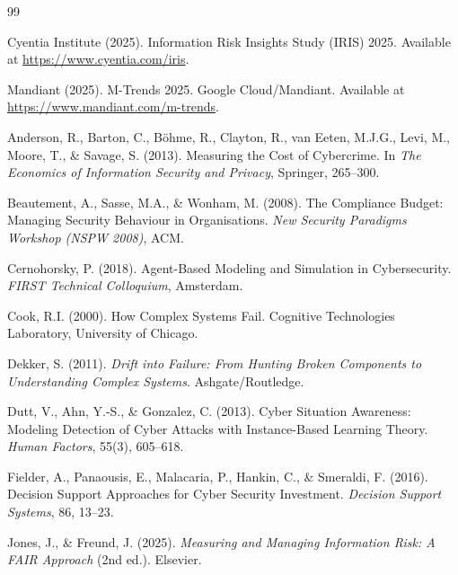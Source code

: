 \documentclass[11pt,a4paper]{article}
\begin{document}
\begin{thebibliography}{99}

Cyentia Institute (2025).
\newblock Information Risk Insights Study (IRIS) 2025.
\newblock Available at \url{https://www.cyentia.com/iris}.

Mandiant (2025).
\newblock M-Trends 2025.
\newblock Google Cloud/Mandiant. Available at \url{https://www.mandiant.com/m-trends}.

Anderson, R., Barton, C., B{\"o}hme, R., Clayton, R., van Eeten, M.J.G., Levi, M., Moore, T., \& Savage, S. (2013).
\newblock Measuring the Cost of Cybercrime.
\newblock In \emph{The Economics of Information Security and Privacy}, Springer, 265--300.

Beautement, A., Sasse, M.A., \& Wonham, M. (2008).
\newblock The Compliance Budget: Managing Security Behaviour in Organisations.
\newblock \emph{New Security Paradigms Workshop (NSPW 2008)}, ACM.

Cernohorsky, P. (2018).
\newblock Agent-Based Modeling and Simulation in Cybersecurity.
\newblock \emph{FIRST Technical Colloquium}, Amsterdam.

Cook, R.I. (2000).
\newblock How Complex Systems Fail.
\newblock Cognitive Technologies Laboratory, University of Chicago.

Dekker, S. (2011).
\newblock \emph{Drift into Failure: From Hunting Broken Components to Understanding Complex Systems}.
\newblock Ashgate/Routledge.

Dutt, V., Ahn, Y.-S., \& Gonzalez, C. (2013).
\newblock Cyber Situation Awareness: Modeling Detection of Cyber Attacks with Instance-Based Learning Theory.
\newblock \emph{Human Factors}, 55(3), 605--618.

Fielder, A., Panaousis, E., Malacaria, P., Hankin, C., \& Smeraldi, F. (2016).
\newblock Decision Support Approaches for Cyber Security Investment.
\newblock \emph{Decision Support Systems}, 86, 13--23.

Jones, J., \& Freund, J. (2025).
\newblock \emph{Measuring and Managing Information Risk: A FAIR Approach} (2nd ed.).
\newblock Elsevier.


\end{thebibliography}
\end{document}
